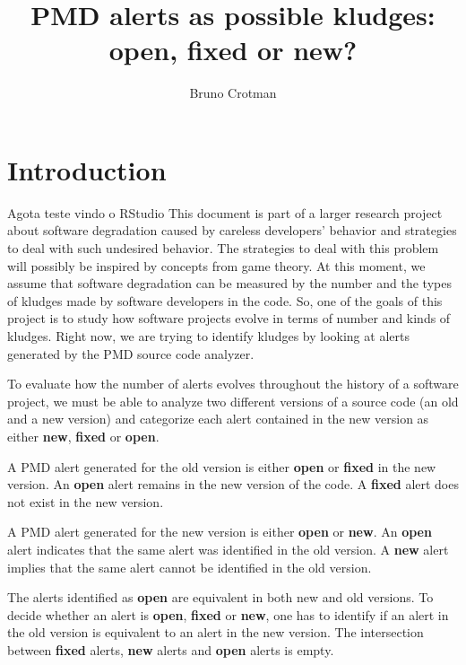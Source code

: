 \documentclass[
]{article}
\title{PMD alerts as possible kludges: open, fixed or new?}
\author{Bruno Crotman}
\date{}
\begin{document}
\maketitle

{
\setcounter{tocdepth}{3}
\tableofcontents
}
\small

\normalsize

\section{Introduction}\label{intro}

Agota teste vindo o RStudio This document is part of a larger research project about software
degradation caused by careless developers' behavior and strategies to
deal with such undesired behavior. The strategies to deal with this
problem will possibly be inspired by concepts from game theory. At this
moment, we assume that software degradation can be measured by the
number and the types of kludges made by software developers in the code.
So, one of the goals of this project is to study how software projects
evolve in terms of number and kinds of kludges. Right now, we are trying
to identify kludges by looking at alerts generated by the PMD source
code analyzer.

To evaluate how the number of alerts evolves throughout the history of a
software project, we must be able to analyze two different versions of a
source code (an old and a new version) and categorize each alert
contained in the new version as either \textbf{new}, \textbf{fixed} or
\textbf{open}.

A PMD alert generated for the old version is either \textbf{open} or
\textbf{fixed} in the new version. An \textbf{open} alert remains in the
new version of the code. A \textbf{fixed} alert does not exist in the
new version.

A PMD alert generated for the new version is either \textbf{open} or
\textbf{new}. An \textbf{open} alert indicates that the same alert was
identified in the old version. A \textbf{new} alert implies that the
same alert cannot be identified in the old version.

The alerts identified as \textbf{open} are equivalent in both new and
old versions. To decide whether an alert is \textbf{open},
\textbf{fixed} or \textbf{new}, one has to identify if an alert in the
old version is equivalent to an alert in the new version. The
intersection between \textbf{fixed} alerts, \textbf{new} alerts and
\textbf{open} alerts is empty.
\end{document}
